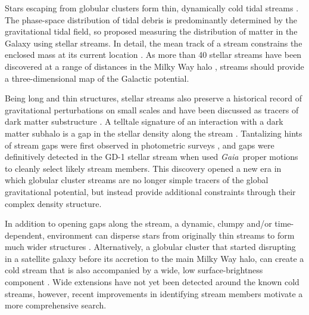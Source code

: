 \documentclass[twocolumn]{aastex62}
\newcommand{\gaia}{\textsl{Gaia}}
\begin{document}
%

Stars escaping from globular clusters form thin, dynamically cold tidal streams \citep[e.g.,][]{combes1999}.
The phase-space distribution of tidal debris is predominantly determined by the gravitational tidal field, so \citet{johnston1999} proposed measuring the distribution of matter in the Galaxy using stellar streams.
In detail, the mean track of a stream constrains the enclosed mass at its current location \citep{bh2018}.
As more than 40 stellar streams have been discovered at a range of distances in the Milky Way halo \citep[see][for a recent review]{gc2016}, streams should provide a three-dimensional map of the Galactic potential.

Being long and thin structures, stellar streams also preserve a historical record of gravitational perturbations on small scales and have been discussed as tracers of dark matter substructure \citep[e.g.,][]{johnston2002, carlberg2009}.
A telltale signature of an interaction with a dark matter subhalo is a gap in the stellar density along the stream \citep[e.g.,][]{ibata2002, yoon2011, eb2015}.
Tantalizing hints of stream gaps were first observed in photometric surveys \citep[e.g.,][]{carlberg2012,cg2013}, and gaps were definitively detected in the GD-1 stellar stream \citep{gd2006} when \citet{pwb} used \gaia\ proper motions to cleanly select likely stream members.
This discovery opened a new era in which globular cluster streams are no longer simple tracers of the global gravitational potential, but instead provide additional constraints  through their complex density structure.

In addition to opening gaps along the stream, a dynamic, clumpy and/or time-dependent, environment can disperse stars from originally thin streams to form much wider structures \citep[e.g.,][]{bonaca2014, ngan2016, pw2016, pearson2017}.
Alternatively, a globular cluster that started disrupting in a satellite galaxy before its accretion to the main Milky Way halo, can create a cold stream that is also accompanied by a wide, low surface-brightness component \citep{carlberg2018}.
Wide extensions have not yet been detected around the known cold streams, however, recent improvements in identifying stream members motivate a more comprehensive search.
\end{document}

